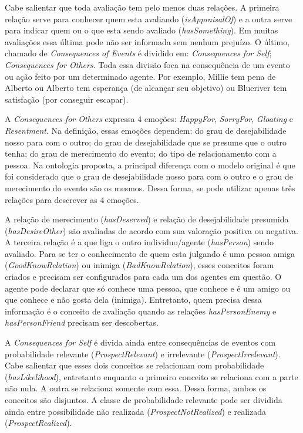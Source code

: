Cabe salientar que toda avaliação tem pelo menos duas relações. A primeira
relação serve para conhecer quem esta avaliando (\emph{isAppraisalOf}) e a
outra serve para indicar quem ou o que esta sendo avaliado
(\emph{hasSomething}). Em muitas avaliações essa última pode não ser
informada sem nenhum prejuízo. O último, chamado de \emph{Consequences of
Events} é
dividido em: \emph{Consequences for Self}; \emph{Consequences for Others}.
Toda essa divisão foca na consequência de um evento ou ação feito por um
determinado agente. Por exemplo, Millie tem pena de Alberto ou
Alberto tem esperança (de alcançar seu objetivo) ou Blueriver tem satisfação
(por conseguir escapar).

A \emph{Consequences for Others} expressa 4 emoções: \emph{HappyFor},
\emph{SorryFor}, \emph{Gloating} e \emph{Resentment}. Na definição, essas
emoções dependem: do grau de desejabilidade nosso para com o outro; do grau de
desejabilidade que se presume que o outro tenha; do grau de merecimento do
evento; do tipo de relacionamento com a pessoa. Na ontologia proposta, a principal
diferença com o modelo original é que foi considerado que o grau de
desejabilidade nosso para com o outro e o grau de merecimento do evento são os
mesmos. Dessa forma, se pode utilizar apenas três relações para descrever as
4 emoções.

A relação de merecimento (\emph{hasDeserved}) e relação de desejabilidade
presumida (\emph{hasDesireOther}) são avaliadas de acordo com sua valoração
positiva ou negativa. A terceira relação é a que liga o outro individuo/agente
(\emph{hasPerson}) sendo avaliado. Para se ter o conhecimento de quem esta
julgando é uma pessoa amiga (\emph{GoodKnowRelation}) ou inimiga
(\emph{BadKnowRelation}), esses conceitos foram criados e precisam ser
configurados para cada um dos agentes em questão. O agente pode declarar que
só conhece uma pessoa, que conhece e é um amigo ou que conhece e não gosta
dela (inimiga). Entretanto, quem precisa dessa informação é o conceito de
avaliação quando as relações \emph{hasPersonEnemy} e \emph{hasPersonFriend}
precisam ser descobertas.

A \emph{Consequences for Self} é divida ainda entre consequências de eventos
com probabilidade relevante (\emph{ProspectRelevant}) e irrelevante
(\emph{ProspectIrrelevant}). Cabe salientar que esses dois conceitos se
relacionam com probabilidade (\emph{hasLikelihood}), entretanto enquanto o
primeiro conceito se relaciona com a parte não nula. A outra se relaciona
somente com essa. Dessa forma, ambos os conceitos são disjuntos. A classe de
probabilidade relevante pode ser dividida ainda entre possibilidade não
realizada (\emph{ProspectNotRealized}) e realizada (\emph{ProspectRealized}).

